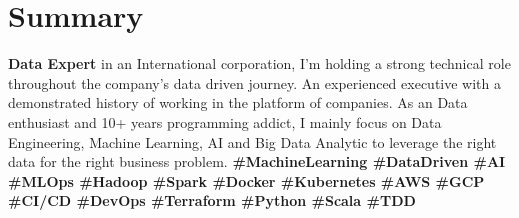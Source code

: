 \section{Summary}
  \textbf{Data Expert} in an International corporation, I’m holding a strong technical role throughout the company’s data driven journey. An experienced executive with a demonstrated history of working in the platform of companies. As an Data enthusiast and 10+ years programming addict, I mainly focus on Data Engineering, Machine Learning, AI and Big Data Analytic to leverage the right data for the right business problem.
  \textbf{\scriptsize{
    \#MachineLearning
    \#DataDriven
    \#AI
    \#MLOps
    \#Hadoop
    \#Spark
    \#Docker
    \#Kubernetes
    \#AWS
    \#GCP
    \#CI/CD
    \#DevOps
    \#Terraform
    \#Python
    \#Scala
    \#TDD
  }}
